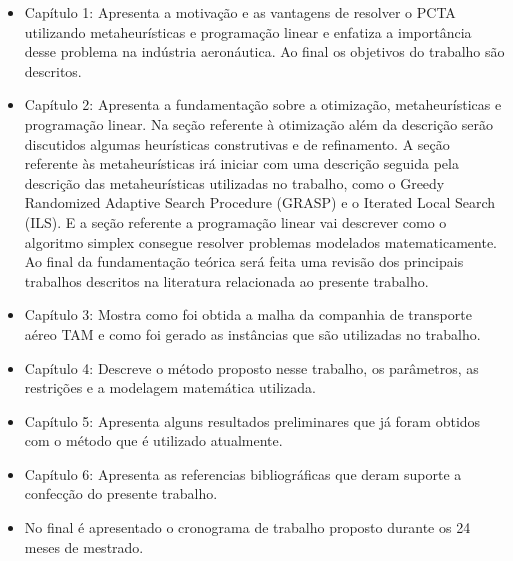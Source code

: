 \begin{itemize}

\item Capítulo 1: Apresenta a motivação e as vantagens de resolver o PCTA utilizando metaheurísticas e programação linear e enfatiza a importância desse problema na indústria aeronáutica.  Ao final os objetivos do trabalho são descritos.

\item Capítulo 2: Apresenta a fundamentação sobre a otimização, metaheurísticas e programação linear. Na seção referente à otimização além da descrição serão discutidos algumas heurísticas  construtivas e de refinamento. A seção referente às metaheurísticas irá iniciar com uma descrição seguida pela descrição das metaheurísticas utilizadas no trabalho, como o Greedy Randomized Adaptive Search Procedure (GRASP) e o Iterated Local Search (ILS). E a seção referente a programação linear vai descrever como o algoritmo simplex consegue resolver problemas modelados matematicamente. Ao final da fundamentação teórica será feita uma revisão dos principais trabalhos descritos na literatura relacionada ao presente trabalho.

\item Capítulo 3: Mostra como foi obtida a malha da companhia de transporte aéreo TAM e como foi gerado as instâncias que são utilizadas no trabalho.

\item Capítulo 4: Descreve o método proposto nesse trabalho, os parâmetros, as restrições e a modelagem matemática utilizada.

\item Capítulo 5: Apresenta alguns resultados preliminares que já foram obtidos com o método que é utilizado atualmente.

\item Capítulo 6: Apresenta as referencias bibliográficas que deram suporte a confecção do presente trabalho.

\item No final é apresentado o cronograma de trabalho proposto durante os 24 meses de mestrado. 
\end{itemize}